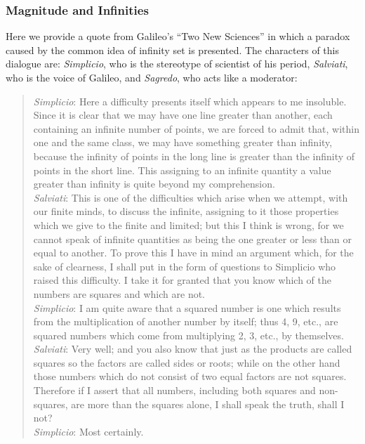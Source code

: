 \subsubsection{Magnitude and Infinities}

Here we provide a quote from Galileo's ``Two New Sciences'' in which a paradox caused by the common idea of infinity set is presented. The characters of this dialogue are: \textit{Simplicio}, who is the stereotype of scientist of his period, \textit{Salviati}, who is the voice of Galileo, and \textit{Sagredo}, who acts like a moderator:

\begin{quote}
	\textit{Simplicio}: Here a difficulty presents itself which appears to me insoluble. Since it is clear that we may have one line greater than another, each containing an infinite number of points, we are forced to admit that, within one and the same class, we may have something greater than infinity, because the infinity of points in the long line is greater than the infinity of points in the short line. This assigning to an infinite quantity a value greater than infinity is quite beyond my comprehension.\\
	\textit{Salviati}: This is one of the difficulties which arise when we attempt, with our finite minds, to discuss the infinite, assigning to it those properties which we give to the finite and limited; but this I think is wrong, for we cannot speak of infinite quantities as being the one greater or less than or equal to another. To prove this I have in mind an argument which, for the sake of clearness, I shall put in the form of questions to Simplicio who raised this difficulty. I take it for granted that you know which of the numbers are squares and which are not.\\
	\textit{Simplicio}: I am quite aware that a squared number is one which results from the multiplication of another number by itself; thus 4, 9, etc., are squared numbers which come from multiplying 2, 3, etc., by themselves.\\
	\textit{Salviati}: Very well; and you also know that just as the products are called squares so the factors are called sides or roots; while on the other hand those numbers which do not consist of two equal factors are not squares. Therefore if I assert that all numbers, including both squares and non-squares, are more than the squares alone, I shall speak the truth, shall I not?\\
	\textit{Simplicio}: Most certainly.\\

\end{quote}
